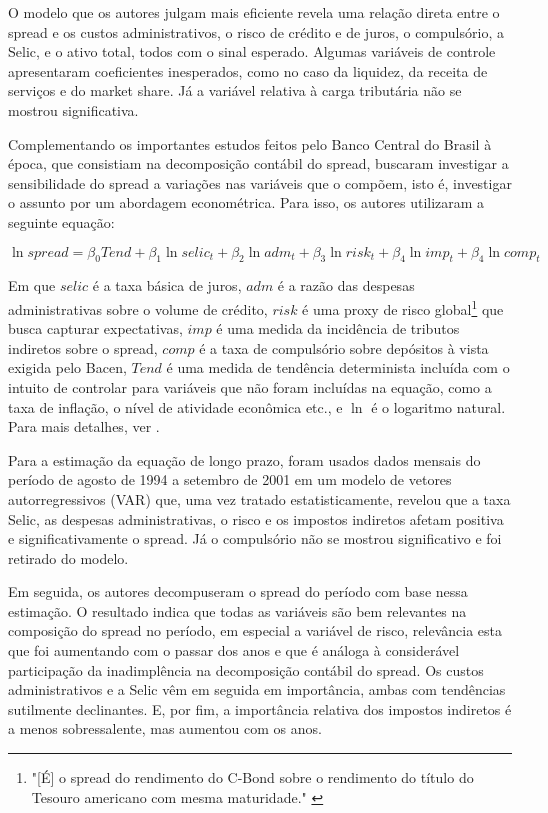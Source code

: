 \documentclass[a4paper,
               article,
               12pt,
               openany,
               oneside,
               english,
               brazil]{abntex2}
\numberwithin{equation}{section}
\begin{document}
    O modelo que os autores julgam mais eficiente revela uma relação direta entre o spread e os custos administrativos, o risco de crédito e de juros, o compulsório, a Selic, e o ativo total, todos com o sinal esperado. Algumas variáveis de controle apresentaram coeficientes inesperados, como no caso da liquidez, da receita de serviços e do market share. Já a variável relativa à carga tributária não se mostrou significativa.

    Complementando os importantes estudos feitos pelo Banco Central do Brasil à época, que consistiam na decomposição contábil do spread, \textcite{nakane02} buscaram investigar a sensibilidade do spread a variações nas variáveis que o compõem, isto é, investigar o assunto por um abordagem econométrica. Para isso, os autores utilizaram a seguinte equação:

    $$\ln spread = \beta_0Tend + \beta_1\ln selic_t + \beta_2\ln adm_t + \beta_3\ln risk_t + \beta_4\ln imp_t + \beta_4\ln comp_t$$

    Em que $ selic $ é a taxa básica de juros, $ adm $ é a razão das despesas administrativas sobre o volume de crédito, $ risk $ é uma proxy de risco global\footnote{"[É] o spread do rendimento do C-Bond sobre o rendimento do título do Tesouro americano com mesma maturidade." \cite[p.~10]{nakane02}} que busca capturar expectativas, $ imp $ é uma medida da incidência de tributos indiretos sobre o spread, $ comp $ é a taxa de compulsório sobre depósitos à vista exigida pelo Bacen, $ Tend $ é uma medida de tendência determinista incluída com o intuito de controlar para variáveis que não foram incluídas na equação, como a taxa de inflação, o nível de atividade econômica etc., e $ \ln $ é o logaritmo natural. Para mais detalhes, ver \textcite[10]{nakane02}.

    Para a estimação da equação de longo prazo, foram usados dados mensais do período de agosto de 1994 a setembro de 2001 em um modelo de vetores autorregressivos (VAR) que, uma vez tratado estatisticamente, revelou que a taxa Selic, as despesas administrativas, o risco e os impostos indiretos afetam positiva e significativamente o spread. Já o compulsório não se mostrou significativo e foi retirado do modelo.

    Em seguida, os autores decompuseram o spread do período com base nessa estimação. O resultado indica que todas as variáveis são bem relevantes na composição do spread no período, em especial a variável de risco, relevância esta que foi aumentando com o passar dos anos e que é análoga à considerável participação da inadimplência na decomposição contábil do spread. Os custos administrativos e a Selic vêm em seguida em importância, ambas com tendências sutilmente declinantes. E, por fim, a importância relativa dos impostos indiretos é a menos sobressalente, mas aumentou com os anos. 
\end{document}
